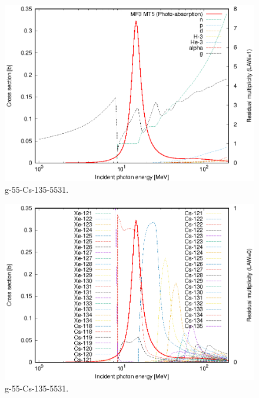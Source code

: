 \begin{figure}
 \includegraphics[width=\linewidth]{eps/g_55-Cs-135_5531.eps}
  \caption{g-55-Cs-135-5531.}
\end{figure}
\begin{figure}
 \includegraphics[width=\linewidth]{eps-law0/g_55-Cs-135_5531.eps}
 \caption{g-55-Cs-135-5531.}
\end{figure}
\newpage \clearpage

